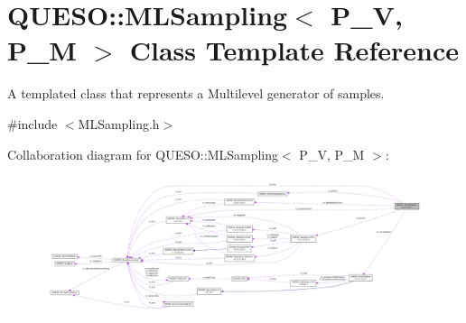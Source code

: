 \hypertarget{class_q_u_e_s_o_1_1_m_l_sampling}{\section{Q\-U\-E\-S\-O\-:\-:M\-L\-Sampling$<$ P\-\_\-\-V, P\-\_\-\-M $>$ Class Template Reference}
\label{class_q_u_e_s_o_1_1_m_l_sampling}
}


A templated class that represents a Multilevel generator of samples.  




{\ttfamily \#include $<$M\-L\-Sampling.\-h$>$}



Collaboration diagram for Q\-U\-E\-S\-O\-:\-:M\-L\-Sampling$<$ P\-\_\-\-V, P\-\_\-\-M $>$\-:
\nopagebreak
\begin{figure}[H]
\begin{center}
\leavevmode
\includegraphics[width=350pt]{class_q_u_e_s_o_1_1_m_l_sampling__coll__graph}
\end{center}
\end{figure}
